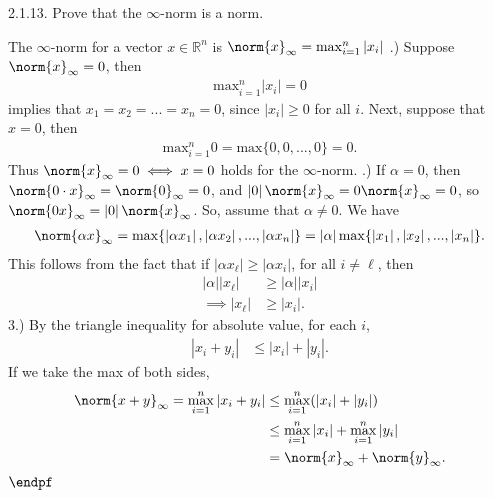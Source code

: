 \documentclass{report}
\begin{document}
    \bigbreak \noindent 
    \begin{mdframed}
        2.1.13.  Prove that the $\infty$-norm is a norm.
    \end{mdframed}
    \bigbreak \noindent 
    The $\infty$-norm for a vector $x\in \mathbb{R}^{n}$ is $\norm{x}_{\infty} = \max_{i=1}^{n}\left\lvert x_{i} \right\rvert  $
    \bigbreak {}.) Suppose $\norm{x}_{\infty} = 0$, then
    \begin{align*}
        \text{max}_{i=1}^{n} \left\lvert x_{i} \right\rvert = 0 
    \end{align*}
    implies that $x_{1} = x_{2} = ... = x_{n} = 0$, since $\left\lvert x_{i} \right\rvert \geq 0$ for all $i$. Next, suppose that $x=0$, then 
    \begin{align*}
       \text{max}_{i=1}^{n} 0  = \text{max}\{0,0,...,0\}  = 0
    .\end{align*}
    Thus $\norm{x}_{\infty} = 0 \iff x = 0$ holds for the $\infty$-norm.
    \bigbreak {}.) If $\alpha = 0$, then $\norm{0 \cdot x}_{\infty} = \norm{0}_{\infty} = 0 $, and $\left\lvert 0 \right\rvert \norm{x}_{\infty} = 0 \norm{x}_{\infty} = 0$, so $\norm{0 x}_{\infty} = \left\lvert 0 \right\rvert \norm{x}_{\infty}$. So, assume that $\alpha \ne 0$. We have
    \begin{align*}
        \norm{\alpha x}_{\infty} = \max\{\left\lvert \alpha x_{1} \right\rvert, \left\lvert \alpha x_{2} \right\rvert, ..., \left\lvert \alpha x_{n} \right\rvert\} = \left\lvert \alpha \right\rvert \max \{\left\lvert x_{1} \right\rvert, \left\lvert x_{2} \right\rvert, ..., \left\lvert x_{n} \right\rvert\}
    .\end{align*}
    This follows from the fact that if $\left\lvert \alpha x_{\ell} \right\rvert \geq \left\lvert \alpha x_{i} \right\rvert$, for all $i\ne \ell$, then 
    \begin{align*}
        \left\lvert \alpha \right\rvert \left\lvert x_{\ell} \right\rvert &\geq \left\lvert \alpha \right\rvert \left\lvert x_{i} \right\rvert \\
        \implies \left\lvert x_{\ell} \right\rvert &\geq \left\lvert x_{i} \right\rvert
    .\end{align*}
    3.) By the triangle inequality for absolute value, for each $i$,
    \begin{align*}
        \left\lvert x_{i} + y_{i} \right\rvert &\leq \left\lvert x_{i} \right\rvert + \left\lvert y_{i} \right\rvert
    .\end{align*}
    If we take the max of both sides,
    \begin{align*}
        \norm{x+y}_{\infty} = \max_{i=1}^{n} \left\lvert x_{i} + y_{i} \right\rvert &\leq \max_{i=1}^{n}(\left\lvert x_{i} \right\rvert + \left\lvert y_{i} \right\rvert) \\
                                                              &\leq \max_{i=1}^{n}\left\lvert x_{i} \right\rvert + \max_{i=1}^{n} \left\lvert y_{i} \right\rvert \\
                                                              &= \norm{x}_{\infty} + \norm{y}_{\infty}
    .\end{align*}
    $\endpf $
\end{document}
